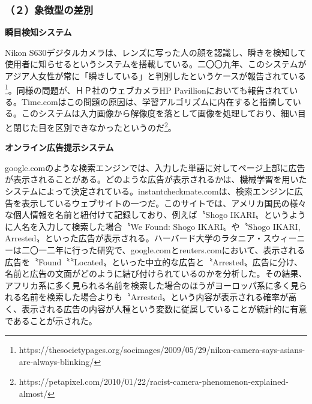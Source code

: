 \documentclass[b5j,twoside,twocolumn]{utarticle}
\begin{document}

\subsubsection*{（２）象徴型の差別}
\noindent\textbf{瞬目検知システム}


Nikon S630デジタルカメラは、レンズに写った人の顔を認識し、瞬きを検知して使用者に知らせるというシステムを搭載している。二〇〇九年、このシステムがアジア人女性が常に「瞬きしている」と判別したというケースが報告されている\footnote{https://thesocietypages.org/socimages/2009/05/29/nikon-camera-says-asians-are-always-blinking/}。同様の問題が、ＨＰ社のウェブカメラHP Pavillionにおいても報告されている。Time.comはこの問題の原因は、学習アルゴリズムに内在すると指摘している。このシステムは入力画像から解像度を落として画像を処理しており、細い目と閉じた目を区別できなかったというのだ\footnote{https://petapixel.com/2010/01/22/racist-camera-phenomenon-explained-almost/}。

\noindent\textbf{オンライン広告提示システム}


google.comのような検索エンジンでは、入力した単語に対してページ上部に広告が表示されることがある。どのような広告が表示されるかは、機械学習を用いたシステムによって決定されている。instantcheckmate.comは、検索エンジンに広告を表示しているウェブサイトの一つだ。このサイトでは、アメリカ国民の様々な個人情報を名前と紐付けて記録しており、例えば〝Shogo IKARI〟というように人名を入力して検索した場合〝We Found: Shogo IKARI〟や〝Shogo IKARI, Arrested〟といった広告が表示される。ハーバード大学のラタニア・スウィーニーは二〇一二年に行った研究\cite{DBLP:journals/corr/abs-1301-6822}で、google.comとreuters.comにおいて、表示される広告を〝Found〝〝Located〟といった中立的な広告と〝Arrested〟広告に分け、名前と広告の文面がどのように結び付けられているのかを分析した。その結果、アフリカ系に多く見られる名前を検索した場合のほうがヨーロッパ系に多く見られる名前を検索した場合よりも〝Arrested〟という内容が表示される確率が高く、表示される広告の内容が人種という変数に従属していることが統計的に有意であることが示された。\\
\end{document}
